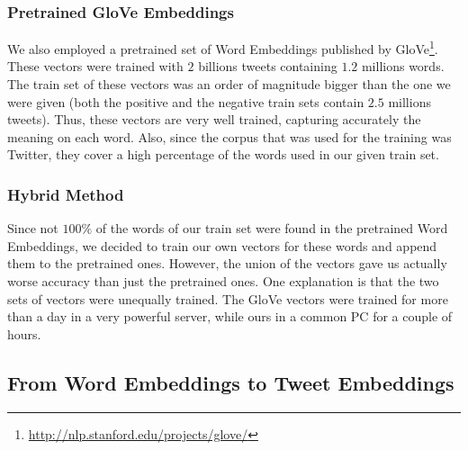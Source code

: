 \subsubsection{Pretrained GloVe Embeddings}
We also employed a pretrained set of Word Embeddings published by GloVe\footnote{\url{http://nlp.stanford.edu/projects/glove/}}.
These vectors were trained with $2$ billions tweets containing $1.2$ millions words.
The train set of these vectors was an order of magnitude bigger than the one we were given
(both the positive and the negative train sets contain $2.5$ millions tweets).
Thus, these vectors are very well trained, capturing accurately the meaning on each word.
Also, since the corpus that was used for the training was Twitter, they cover a high percentage of  
the words used in our given train set.

\subsubsection{Hybrid Method}
Since not $100\%$ of the words of our train set were found in the pretrained Word Embeddings, we decided to train our own vectors for these words and append them to the pretrained ones.
However, the union of the vectors gave us actually worse accuracy than just the pretrained ones.
One explanation is that the two sets of vectors were unequally trained. 
The GloVe vectors were trained for more than a day in a very powerful server, while ours in a common PC for a couple of hours.



\subsection{From Word Embeddings to Tweet Embeddings}